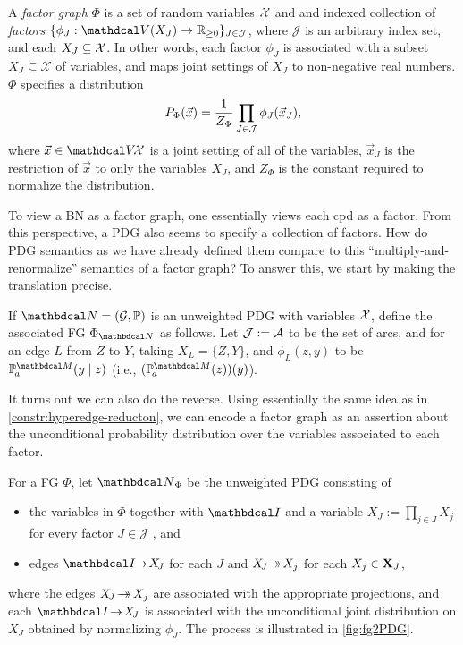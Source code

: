 \begin{defn}
 A \emph{factor graph} $\Phi$ is a set of random variables
        $\X$ and
    and indexed collection of \emph{factors}
       $\{\phi_J : \V(X_J) \to \mathbb R_{\geq0}\}_{J \in
\mathcal J }$,
where $\mathcal J$ is an arbitrary index set, 
and each $X_J \subseteq \X$.  
In other words, each factor $\phi_J$ is associated with a subset
$X_J\subseteq \mathcal{X}$ of variables, and maps
joint settings of $X_J$ to non-negative real numbers.
$\Phi$ specifies a distribution
\[ {\Pr}_{\Phi}(\vec x) = \frac{1}{Z_{\Phi}}
 	\prod_{J \in \cal J} \phi_J(\vec x_J), \]
where $\vec{x} \in \V\!\X$ is a joint setting of all of the variables,
 $\vec{x}_J$ is the restriction of $\vec{x}$ to only the
 variables $X_J$, and $Z_{\Phi}$ is the constant required to
 normalize the distribution.  
\end{defn}

To view a BN as a factor graph, one essentially views each cpd as a factor.
From this perspective, a PDG also seems to specify a collection of factors. 
How do PDG semantics as we have already defined them compare to this 
``multiply-and-renormalize'' semantics of a factor graph?
To answer this, we start by making the translation precise.

\begin{defn}\label{def:PDG2fg}
If $\dg N = (\Gr, \mathbb P)$ is an unweighted PDG with variables $\X$, 
define the associated FG $\FGof{\dg N}$ as follows. 
Let $\mathcal J := \Ar$ to be the set of arcs, 
and for an edge $L$ from $Z$ to $Y$, taking $X_{L} = \{Z,Y\}$, and $\phi_L(z,y)$ to be
$\p_a^{\dg M}(y \mid z)$ (i.e., $(\p_a^{\dg M}(z))(y)$).
\end{defn}


It turns out we can also do the reverse. 
Using essentially the same idea as in \cref{constr:hyperedge-reducton},
we can encode a factor graph as an assertion about the unconditional
probability distribution over the variables associated to each
factor.  

\begin{defn} \label{def:fg2PDG}
For a FG $\Phi$, let $\UPDGof{\Phi}$ be
the unweighted PDG consisting of
\begin{itemize}
	\item the variables in $\Phi$ together
   with $\pdgunit$ and a variable $X_{\!J} := \prod_{j \in J} X_j$ for every factor $J \in \mathcal J$%
   , and
   \item edges ${\pdgunit} \!\!\to\! X_{\!J}$ for each $J$ and $X_{\!J} \!\!\tto\! X_j$ for each $X_j \in \mat X_J$,
\end{itemize}
where the edges $ X_{\!J} \!\tto\! X_j$ are associated with the appropriate projections, and each ${\pdgunit} \!\to\! X_{\!J}$ is associated with the unconditional joint distribution on $X_J$ obtained by normalizing $\phi_J$. 
The process is illustrated in \cref{fig:fg2PDG}.
\end{defn}



